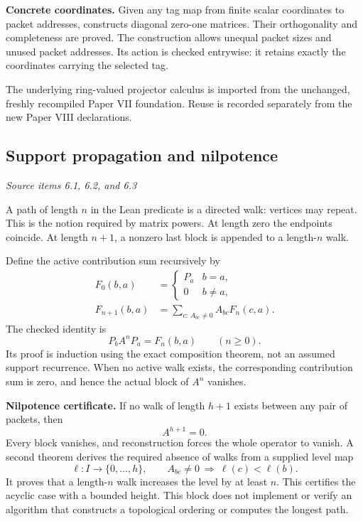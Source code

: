 \textbf{Concrete coordinates.} Given any tag map from finite scalar coordinates to packet addresses,  constructs diagonal zero-one matrices. Their orthogonality and completeness are proved. The construction allows unequal packet sizes and unused packet addresses. Its action is checked entrywise: it retains exactly the coordinates carrying the selected tag.

The underlying ring-valued projector calculus is imported from the unchanged, freshly recompiled Paper VII foundation. Reuse is recorded separately from the new Paper VIII declarations.



\subsection{Support propagation and nilpotence}\label{supp1:subsection:002}\textit{Source items 6.1, 6.2, and 6.3}\par
A path of length $n$ in the Lean predicate  is a directed walk: vertices may repeat. This is the notion required by matrix powers. At length zero the endpoints coincide. At length $n+1$, a nonzero last block is appended to a length-$n$ walk.

Define the active contribution sum recursively by
\begin{align*}
F_0(b,a)&=\begin{cases}P_a&b=a,\\0&b\ne a,\end{cases}\\
F_{n+1}(b,a)&=\sum_{c:\,A_{bc}\ne0}A_{bc}F_n(c,a).
\end{align*}
The checked identity is
\[
\boxed{P_bA^nP_a=F_n(b,a)\qquad(n\ge0).}
\]
Its proof is induction using the exact composition theorem, not an assumed support recurrence. When no active walk exists, the corresponding contribution sum is zero, and hence the actual block of $A^n$ vanishes.

\textbf{Nilpotence certificate.} If no walk of length $h+1$ exists between any pair of packets, then
\[
\boxed{A^{h+1}=0.}
\]
Every block vanishes, and reconstruction forces the whole operator to vanish. A second theorem derives the required absence of walks from a supplied level map
\[
\ell:I\longrightarrow\{0,\ldots,h\},\qquad
A_{bc}\ne0\ \Longrightarrow\ \ell(c)<\ell(b).
\]
It proves that a length-$n$ walk increases the level by at least $n$. This certifies the acyclic case with a bounded height. This block does not implement or verify an algorithm that constructs a topological ordering or computes the longest path.

